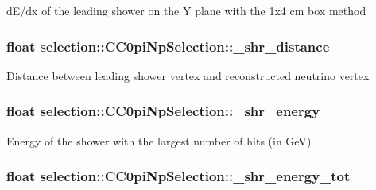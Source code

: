 d\-E/dx of the leading shower on the Y plane with the 1x4 cm box method \hypertarget{classselection_1_1CC0piNpSelection_a20705dc212e16009a0ce4ace27d54af7}{
\subsubsection[{\-\_\-shr\-\_\-distance}]{\setlength{\rightskip}{0pt plus 5cm}float selection\-::\-C\-C0pi\-Np\-Selection\-::\-\_\-shr\-\_\-distance\hspace{0.3cm}{\ttfamily [private]}}}\label{classselection_1_1CC0piNpSelection_a20705dc212e16009a0ce4ace27d54af7}
Distance between leading shower vertex and reconstructed neutrino vertex \hypertarget{classselection_1_1CC0piNpSelection_abf854f061d0476dc08ae8b3d71e7a86d}{
\subsubsection[{\-\_\-shr\-\_\-energy}]{\setlength{\rightskip}{0pt plus 5cm}float selection\-::\-C\-C0pi\-Np\-Selection\-::\-\_\-shr\-\_\-energy\hspace{0.3cm}{\ttfamily [private]}}}\label{classselection_1_1CC0piNpSelection_abf854f061d0476dc08ae8b3d71e7a86d}
Energy of the shower with the largest number of hits (in Ge\-V) \hypertarget{classselection_1_1CC0piNpSelection_a6e42f011e79f646f36df7148907d1b59}{
\subsubsection[{\-\_\-shr\-\_\-energy\-\_\-tot}]{\setlength{\rightskip}{0pt plus 5cm}float selection\-::\-C\-C0pi\-Np\-Selection\-::\-\_\-shr\-\_\-energy\-\_\-tot\hspace{0.3cm}{\ttfamily [private]}}}\label{classselection_1_1CC0piNpSelection_a6e42f011e79f646f36df7148907d1b59}
